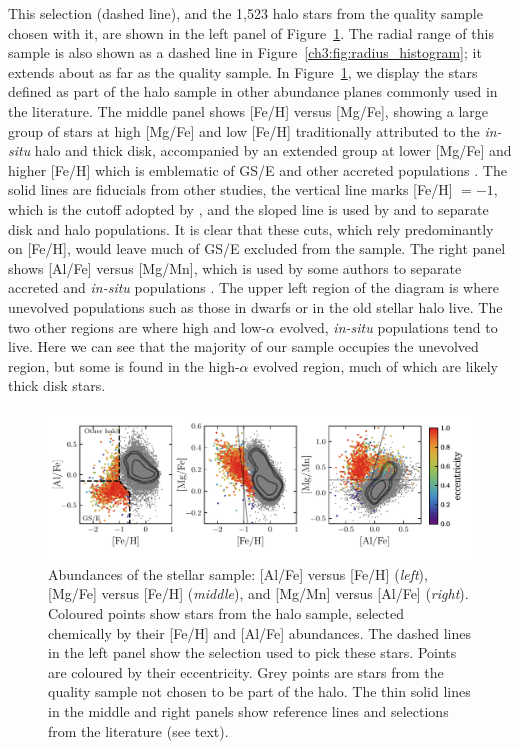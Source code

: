 This selection (dashed line), and the 1,523 halo stars from the quality sample chosen with it, are shown in the left panel of Figure~\ref{ch3:fig:halo_abundances}. The radial range of this sample is also shown as a dashed line in Figure~\ref{ch3:fig:radius_histogram}; it extends about as far as the quality sample. In Figure~\ref{ch3:fig:halo_abundances}, we display the stars defined as part of the halo sample in other abundance planes commonly used in the literature. The middle panel shows [Fe/H] versus [Mg/Fe], showing a large group of stars at high [Mg/Fe] and low [Fe/H] traditionally attributed to the \textit{in-situ} halo and thick disk, accompanied by an extended group at lower [Mg/Fe] and higher [Fe/H] which is emblematic of GS/E and other accreted populations \parencite[e.g.][]{hasselquist21,horta23a}. The solid lines are fiducials from other studies, the vertical line marks [Fe/H] $= -1$, which is the cutoff adopted by \cite{mackereth20}, and the sloped line is used by \textcite{mackereth19a} and \cite{lane22} to separate disk and halo populations. It is clear that these cuts, which rely predominantly on [Fe/H], would leave much of GS/E excluded from the sample. The right panel shows [Al/Fe] versus [Mg/Mn], which is used by some authors to separate accreted and \textit{in-situ} populations \parencite[e.g.][]{das20,horta21a,fernandez23}. The upper left region of the diagram is where unevolved populations such as those in dwarfs or in the old stellar halo live. The two other regions are where high and low-$\alpha$ evolved, \textit{in-situ} populations tend to live. Here we can see that the majority of our sample occupies the unevolved region, but some is found in the high-$\alpha$ evolved region, much of which are likely thick disk stars.

\begin{figure}
    \centering
    \includegraphics[width=\textwidth]{figure/ch3/halo_abundances.pdf}
    \caption{Abundances of the stellar sample: [Al/Fe] versus [Fe/H] (\textit{left}), [Mg/Fe] versus [Fe/H] (\textit{middle}), and [Mg/Mn] versus [Al/Fe] (\textit{right}). Coloured points show stars from the halo sample, selected chemically by their [Fe/H] and [Al/Fe] abundances. The dashed lines in the left panel show the selection used to pick these stars. Points are coloured by their eccentricity. Grey points are stars from the quality sample not chosen to be part of the halo. The thin solid lines in the middle and right panels show reference lines and selections from the literature (see text).}
    \label{ch3:fig:halo_abundances}
\end{figure}

